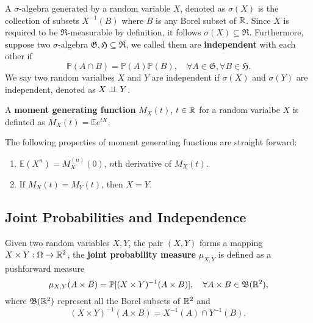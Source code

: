 \begin{definition}
A $\sigma$-algebra generated by a random variable $X$, denoted as $\sigma(X)$ is the collection of subsets $X^{-1}(B)$ where $B$ is any Borel subset of $\mathbb{R}$. Since $X$ is required to be $\mathfrak{R}$-measurable by definition, it follows $\sigma(X)\subseteq\mathfrak{R}$. Furthermore, suppose two $\sigma$-algebra $\mathfrak{G,H}\subseteq\mathfrak{R}$, we called them are \textbf{independent} with each other if
	\begin{equation}
	\mathbb{P}(A\cap B)=\mathbb{P}(A)\mathbb{P}(B),\quad \forall A\in\mathfrak{G}, \forall B\in\mathfrak{H}.
	\label{eq:def_independence}
	\end{equation}
We say two random varialbes $X$ and $Y$ are independent if $\sigma(X)$ and $\sigma(Y)$ are independent, denoted as $X\perp\!\!\!\perp Y$.
\end{definition}

\begin{definition}
A \textbf{moment generating function} $M_X(t)$, $t\in\mathbb{R}$ for a random varialbe $X$ is definted as $M_X(t)=\mathbb{E}e^{tX}$.
\end{definition}

\begin{theorem}
The following properties of moment generating functions are straight forward:
	\begin{enumerate}
	\item $\mathbb{E}(X^n)=M_X^{(n)}(0)$, $n$th derivative of $M_X(t)$.
	\item If $M_X(t)=M_Y(t)$, then $X=Y$.
	\end{enumerate}
\end{theorem}


\subsection{Joint Probabilities and Independence}
\begin{definition}
Given two random variables $X,Y$, the pair $(X,Y)$ forms a mapping $X\times Y:\Omega\to\mathbb{R}^2$, the \textbf{joint probability measure} $\mu_{X,Y}$ is defined as a pushforward measure
\begin{equation}
\mu_{X,Y}(A\times B)=\mathbb{P}[(X\times Y)^{-1}(A\times B)], \quad \forall A\times B\in\mathfrak{B}(\mathbb{R}^2),
\end{equation}
where $\mathfrak{B}(\mathbb{R}^2)$ represent all the Borel subsets of $\mathbb{R}^2$ and
\begin{equation}
(X\times Y)^{-1}(A\times B) = X^{-1}(A)\cap Y^{-1}(B),
\end{equation}
\end{definition}

